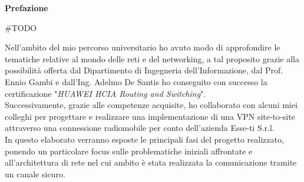 \clearpage
\phantom{a}
\vfill

\begin{center}
    \textbf{Prefazione}
\end{center}

\begin{flushleft}

    \#TODO

    Nell'ambito del mio percorso universitario ho avuto modo di approfondire le tematiche relative al mondo delle reti e del networking, a tal proposito grazie alla possibilità offerta dal Dipartimento di Ingegneria dell'Informazione, dal Prof. Ennio Gambi e dall'Ing. Adelmo De Santis ho conseguito con successo la certificazione "\textit{HUAWEI HCIA Routing and Switching}".\\
    Successivamente, grazie alle competenze acquisite, ho collaborato con alcuni miei colleghi
    per progettare e realizzare una implementazione di una VPN site-to-site attraverso una connessione radiomobile per conto dell'azienda Esse-ti S.r.l.\\
    In questo elaborato verranno esposte le principali fasi del
    progetto realizzato, ponendo un particolare focus sulle problematiche iniziali affrontate e all'architettura di rete nel cui ambito è stata realizzata la comunicazione tramite un canale sicuro.

\end{flushleft}

\vfill
\newpage